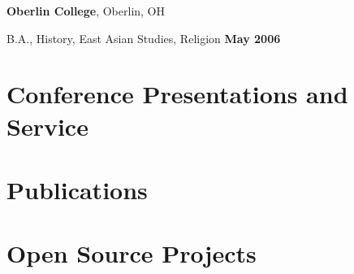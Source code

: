 \documentclass[margin,line]{res}
\newenvironment{list1}{
  \begin{list}{\ding{113}}{%
      \setlength{\itemsep}{0in}
      \setlength{\parsep}{0in} \setlength{\parskip}{0in}
      \setlength{\topsep}{0in} \setlength{\partopsep}{0in}
      \setlength{\leftmargin}{0.17in}}}{\end{list}}
\begin{document}
\begin{resume}
\textbf {Oberlin College}, Oberlin, OH\\
\vspace*{-.1in}
\begin{list1}
\item[] B.A., History, East Asian Studies, Religion \hfill \textbf{ May 2006}
\end{list1}

\section{\sc Conference Presentations and Service}



\section{\sc Publications}




\section{\sc Open Source Projects}


\end{resume}
\end{document}
